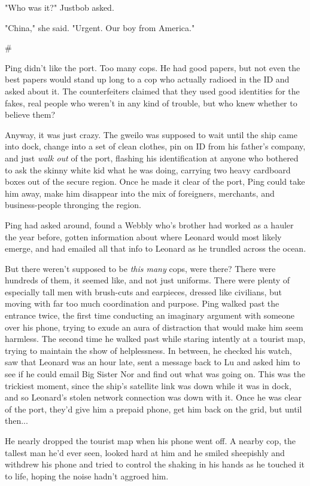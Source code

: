 "Who was it?" Justbob asked.

"China," she said. "Urgent. Our boy from America."

\#

Ping didn't like the port. Too many cops. He had good papers, but
not even the best papers would stand up long to a cop who actually
radioed in the ID and asked about it. The counterfeiters claimed
that they used good identities for the fakes, real people who
weren't in any kind of trouble, but who knew whether to believe
them?

Anyway, it was just crazy. The gweilo was supposed to wait until
the ship came into dock, change into a set of clean clothes, pin on
ID from his father's company, and just \emph{walk out} of the port,
flashing his identification at anyone who bothered to ask the
skinny white kid what he was doing, carrying two heavy cardboard
boxes out of the secure region. Once he made it clear of the port,
Ping could take him away, make him disappear into the mix of
foreigners, merchants, and business-people thronging the region.

Ping had asked around, found a Webbly who's brother had worked as a
hauler the year before, gotten information about where Leonard
would most likely emerge, and had emailed all that info to Leonard
as he trundled across the ocean.

But there weren't supposed to be \emph{this many} cops, were there?
There were hundreds of them, it seemed like, and not just uniforms.
There were plenty of especially tall men with brush-cuts and
earpieces, dressed like civilians, but moving with far too much
coordination and purpose. Ping walked past the entrance twice, the
first time conducting an imaginary argument with someone over his
phone, trying to exude an aura of distraction that would make him
seem harmless. The second time he walked past while staring
intently at a tourist map, trying to maintain the show of
helplessness. In between, he checked his watch, saw that Leonard
was an hour late, sent a message back to Lu and asked him to see if
he could email Big Sister Nor and find out what was going on. This
was the trickiest moment, since the ship's satellite link was down
while it was in dock, and so Leonard's stolen network connection
was down with it. Once he was clear of the port, they'd give him a
prepaid phone, get him back on the grid, but until then...

He nearly dropped the tourist map when his phone went off. A nearby
cop, the tallest man he'd ever seen, looked hard at him and he
smiled sheepishly and withdrew his phone and tried to control the
shaking in his hands as he touched it to life, hoping the noise
hadn't aggroed him.

